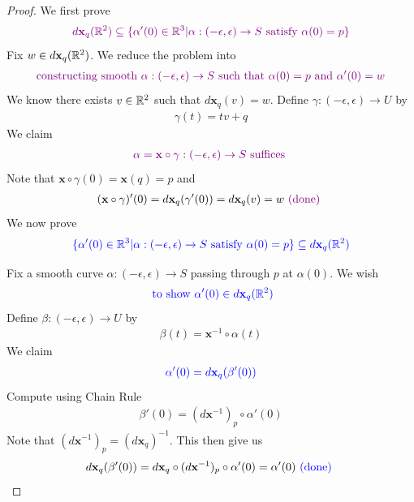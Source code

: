 \documentclass{report}
\begin{document}
\begin{proof}
We first prove 
\begin{align*}
\textcolor{violet}{d\textbf{x}_q(\mathbb{R}^2)\subseteq \{ \alpha '(0)\in\mathbb{R}^3|\alpha:(-\epsilon ,\epsilon )\rightarrow S\text{ satisfy }\alpha (0)=p \}}
\end{align*}
Fix $w\in d\textbf{x}_q(\mathbb{R}^2)$. We reduce the problem into 
\begin{align*}
\textcolor{violet}{\text{ constructing smooth $\alpha :(-\epsilon ,\epsilon )\rightarrow S$ such that $\alpha (0)=p$ and $\alpha '(0)=w$ }}
\end{align*}
We know there exists $v \in\mathbb{R}^2$ such that $d\textbf{x}_q(v)=w$. Define $\gamma :(-\epsilon ,\epsilon )\rightarrow U$ by 
\begin{align*}
\gamma (t)= tv+q
\end{align*}
We claim 
\begin{align*}
  \textcolor{violet}{\alpha =\textbf{x}\circ \gamma :(-\epsilon ,\epsilon )\rightarrow S\text{ suffices }}
\end{align*}
Note that $\textbf{x}\circ \gamma (0)=\textbf{x}(q)=p$ and
\begin{align*}
(\textbf{x}\circ \gamma )'(0)=d\textbf{x}_q(\gamma '(0))=d\textbf{x}_q(v)=w \textcolor{violet}{\text{ (done) }} 
\end{align*}
We now prove 
\begin{align*}
\textcolor{blue}{\{ \alpha '(0)\in\mathbb{R}^3|\alpha:(-\epsilon ,\epsilon )\rightarrow S\text{ satisfy }\alpha (0)=p \}\subseteq d\textbf{x}_q(\mathbb{R}^2)}
\end{align*}

Fix a smooth curve $\alpha :(-\epsilon ,\epsilon ) \rightarrow S$ passing through $p$ at $\alpha (0)$. We wish 
\begin{align*}
\textcolor{blue}{\text{ to show }\alpha '(0)\in d\textbf{x}_q(\mathbb{R}^2)}
\end{align*}
Define $\beta :(-\epsilon ,\epsilon )\rightarrow U$ by 
\begin{align*}
\beta (t)=\textbf{x}^{-1}\circ \alpha (t)
\end{align*}
We claim 
\begin{align*}
\textcolor{blue}{\alpha '(0)=d\textbf{x}_q(\beta '(0))}
\end{align*}
Compute using Chain Rule 
\begin{align*}
\beta '(0)=(d\textbf{x}^{-1})_p\circ \alpha '(0)
\end{align*}
Note that $(d\textbf{x}^{-1})_p=(d\textbf{x}_q)^{-1}$. This then give us 
\begin{align*}
  d\textbf{x}_q(\beta '(0))=d\textbf{x}_q \circ (d\textbf{x}^{-1})_p \circ \alpha '(0)=\alpha '(0)\textcolor{blue}{\text{ (done) }}
\end{align*}
\end{proof}
\end{document}
